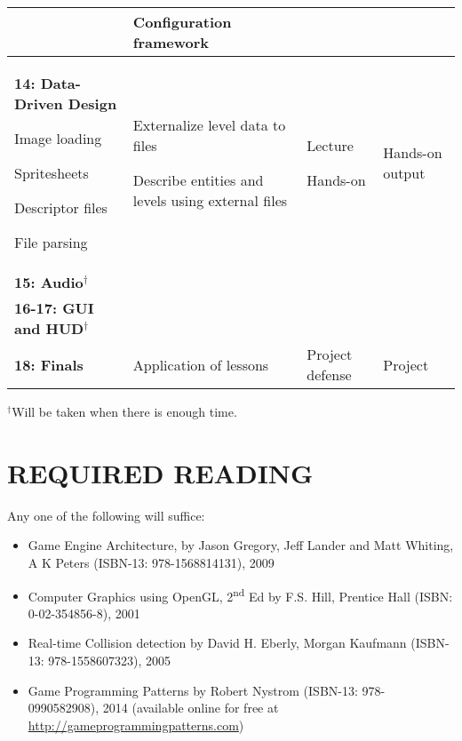 \documentclass[10pt]{article}
\newenvironment{itemize*}{
\begin{itemize}[leftmargin=1em,noitemsep,nolistsep]
}{\end{itemize}}
\begin{document}
\begin{longtable}{||p{1.8in}|p{2.4in}|p{1.3in}|p{1in}||}
\begin{itemize*}
	\end{itemize*} & Configuration framework \\ \hline
\textbf{14: Data-Driven Design}
	\begin{itemize*}
		\item Image loading
		\item Spritesheets
		\item Descriptor files
		\item File parsing
	\end{itemize*} &
	\begin{itemize*}
		\item Externalize level data to files
		\item Describe entities and levels using external files
	\end{itemize*} &
	\begin{itemize*}
		\item Lecture
		\item Hands-on
	\end{itemize*} & Hands-on output\\ \hline
\textbf{15: Audio$^\dagger$} & & &\\ \hline
\textbf{16-17: GUI and HUD$^\dagger$} & & &\\ \hline
\textbf{18: Finals} & Application of lessons & Project defense & Project \\ \hline
\end{longtable}

$^\dagger$Will be taken when there is enough time.

\section{REQUIRED READING}
Any one of the following will suffice:
\begin{itemize}[noitemsep,nolistsep]
\item Game Engine Architecture, by Jason Gregory, Jeff Lander and Matt Whiting, A K Peters (ISBN-13: 978-1568814131), 2009
\item Computer Graphics using OpenGL, 2\textsuperscript{nd} Ed by F.S. Hill, Prentice Hall (ISBN: 0-02-354856-8), 2001
\item Real-time Collision detection by David H. Eberly, Morgan Kaufmann (ISBN-13: 978-1558607323), 2005
\item Game Programming Patterns by Robert Nystrom (ISBN-13: 978-0990582908), 2014 (available online for free at \url{http://gameprogrammingpatterns.com})
\end{itemize}
\end{document}
